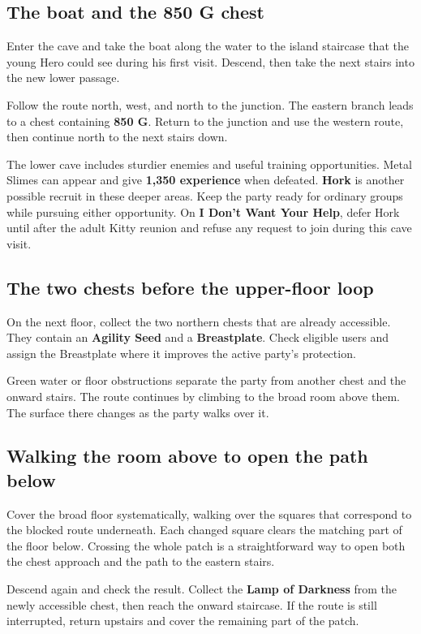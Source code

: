 \subsection*{The boat and the 850 G chest}

Enter the cave and take the boat along the water to the island staircase
that the young Hero could see during his first visit. Descend, then take
the next stairs into the new lower passage.

Follow the route north, west, and north to the junction. The eastern
branch leads to a chest containing \textbf{850 G}. Return to the
junction and use the western route, then continue north to the next
stairs down.

The lower cave includes sturdier enemies and useful training opportunities.
Metal Slimes can appear and give \textbf{1,350 experience} when defeated.
\textbf{Hork} is another possible recruit in these deeper areas. Keep
the party ready for ordinary groups while pursuing either opportunity.
On \textbf{I Don't Want Your Help}, defer Hork until after the adult
Kitty reunion and refuse any request to join during this cave visit.

\subsection*{The two chests before the upper-floor loop}

On the next floor, collect the two northern chests that are already
accessible. They contain an \textbf{Agility Seed} and a
\textbf{Breastplate}. Check eligible users and assign the Breastplate
where it improves the active party's protection.

Green water or floor obstructions separate the party from another chest
and the onward stairs. The route continues by climbing to the broad
room above them. The surface there changes as the party walks over it.

\subsection*{Walking the room above to open the path below}

Cover the broad floor systematically, walking over the squares that
correspond to the blocked route underneath. Each changed square clears
the matching part of the floor below. Crossing the whole patch is a
straightforward way to open both the chest approach and the path to
the eastern stairs.

Descend again and check the result. Collect the \textbf{Lamp of Darkness}
from the newly accessible chest, then reach the onward staircase. If
the route is still interrupted, return upstairs and cover the remaining
part of the patch.


